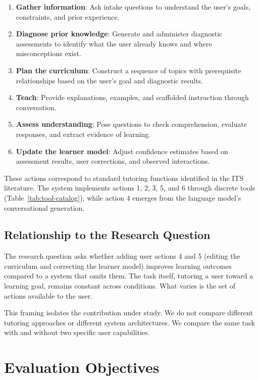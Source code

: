 \documentclass[logo,bsc,singlespacing,parskip,online]{infthesis}
\begin{document}
\begin{enumerate}
    \item \textbf{Gather information}: Ask intake questions to understand the user's goals, constraints, and prior experience.
    \item \textbf{Diagnose prior knowledge}: Generate and administer diagnostic assessments to identify what the user already knows and where misconceptions exist.
    \item \textbf{Plan the curriculum}: Construct a sequence of topics with prerequisite relationships based on the user's goal and diagnostic results.
    \item \textbf{Teach}: Provide explanations, examples, and scaffolded instruction through conversation.
    \item \textbf{Assess understanding}: Pose questions to check comprehension, evaluate responses, and extract evidence of learning.
    \item \textbf{Update the learner model}: Adjust confidence estimates based on assessment results, user corrections, and observed interactions.
\end{enumerate}

These actions correspond to standard tutoring functions identified in the ITS literature. The system implements actions 1, 2, 3, 5, and 6 through discrete tools (Table~\ref{tab:tool-catalog}), while action 4 emerges from the language model's conversational generation.

\subsection{Relationship to the Research Question}

The research question asks whether adding user actions 4 and 5 (editing the curriculum and correcting the learner model) improves learning outcomes compared to a system that omits them. The task itself, tutoring a user toward a learning goal, remains constant across conditions. What varies is the set of actions available to the user.

This framing isolates the contribution under study. We do not compare different tutoring approaches or different system architectures. We compare the same task with and without two specific user capabilities.

\section{Evaluation Objectives}
\end{document}
